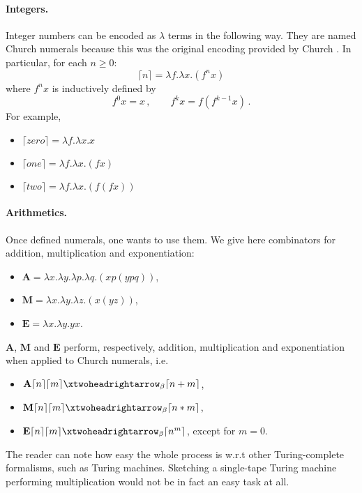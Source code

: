 \paragraph{Integers.}
Integer numbers can be encoded as $\lambda$ terms in the following way. They are named Church numerals because this was the original encoding provided by Church \cite{church_set_1933}. In particular, for each $n\geq 0$:
$$
\lceil n\rceil=\lambda f.\lambda x.(f^nx)
$$
where $f^nx$ is inductively defined by
$$
f^0x=x\,,\qquad f^kx=f(f^{k-1}x)\,.
$$
For example,
\begin{itemize}
	\item $\lceil zero\rceil=\lambda f.\lambda x.x$
	\item $\lceil one\rceil=\lambda f.\lambda x.(fx)$
	\item $\lceil two\rceil=\lambda f.\lambda x.(f(fx))$
\end{itemize}
\paragraph{Arithmetics.}
Once defined numerals, one wants to use them. We give here combinators for addition, multiplication and exponentiation:
\begin{itemize}
	\item $\mathbf{A}=\lambda x.\lambda y.\lambda p.\lambda q.(xp(ypq))$,
	\item $\mathbf{M}=\lambda x.\lambda y.\lambda z.(x(yz))$,
	\item $\mathbf{E}=\lambda x.\lambda y.yx$.
\end{itemize}
\begin{proposition}
	$\mathbf{A}$, $\mathbf{M}$ and $\mathbf{E}$ perform, respectively, addition, multiplication and exponentiation when applied to Church numerals, i.e.
	\begin{itemize}
		\item $\mathbf{A}\lceil n\rceil\lceil m\rceil\redbetared{}\lceil n+m\rceil$,
		\item $\mathbf{M}\lceil n\rceil\lceil m\rceil\redbetared{}\lceil n*m\rceil$,
		\item $\mathbf{E}\lceil n\rceil\lceil m\rceil\redbetared{}\lceil n^m\rceil$, except for $m=0$.
	\end{itemize}
\end{proposition}
The reader can note how easy the whole process is w.r.t other Turing-complete formalisms, such as Turing machines. Sketching a single-tape Turing machine performing multiplication would not be in fact an easy task at all.
